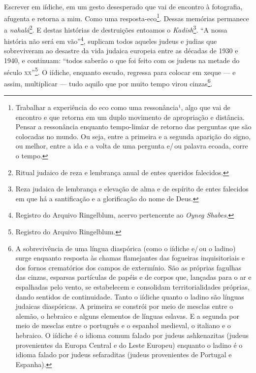 Escrever em iídiche, em um gesto desesperado que vai de encontro
à fotografia, afugenta e retorna a mim. Como uma
resposta-eco\footnote{Trabalhar a experiência do eco como uma
  ressonância¹, algo que vai de encontro e que retorna em um duplo
  movimento de apropriação e distância. Pensar a ressonância enquanto tempo-limiar de retorno das
  perguntas que são colocadas no mundo. Ou seja, entre a primeira e a
  segunda aparição do signo, ou melhor, entre a ida e a volta de uma
  pergunta e/\,ou palavra ecoada, corre o tempo.}. Dessas memórias
permanece a \emph{nahalá}\footnote{Ritual judaico de reza e lembrança
  anual de entes queridos falecidos.}. E destas histórias de destruições
entoamos o \emph{Kadish}\footnote{Reza judaica de lembrança e elevação
  de alma e de espírito de entes falecidos em que há a santificação e a
  glorificação do nome de Deus.}. ``A nossa história não será em
vão''\footnote{Registro do Arquivo Ringelblum, acervo pertencente ao \emph{Oyneg Shabes}.}, suplicam todos aqueles judeus e judias que sobreviveram
ao desastre da vida judaica europeia entre as décadas de 1930 e 1940, e
continuam: ``todos saberão o que foi feito com os judeus na metade do século \textsc{xx}''\footnote{Registro do Arquivo
  Ringelblum.}. O iídiche, enquanto escudo, regressa para colocar
em xeque --- e assim, multiplicar --- tudo aquilo que por muito tempo
virou cinzas\footnote{A sobrevivência de uma língua diaspórica (como o
  iídiche e/\,ou o ladino) surge enquanto resposta às
  chamas flamejantes das fogueiras inquisitoriais e dos fornos
  crematórios dos campos de extermínio. São as próprias fagulhas das
  cinzas, esparsas partículas de papéis e de corpos que, lançadas para o
  ar e espalhadas pelo vento, se estabelecem e consolidam
  territorialidades próprias, dando sentidos de continuidade. Tanto o iídiche quanto o ladino são línguas
  judaicas diaspóricas. A primeira se constrói por meio de mesclas entre
  o alemão, o hebraico e alguns elementos de línguas eslavas. E a
  segunda por meio de mesclas entre o português e o espanhol medieval, o
  italiano e o hebraico. O iídiche é o idioma comum falado por
  judeus ashkenazitas (judeus provenientes da Europa Central e do
  Leste Europeu) enquanto o ladino é o idioma falado por judeus
  sefaraditas (judeus provenientes de Portugal e Espanha).}.


